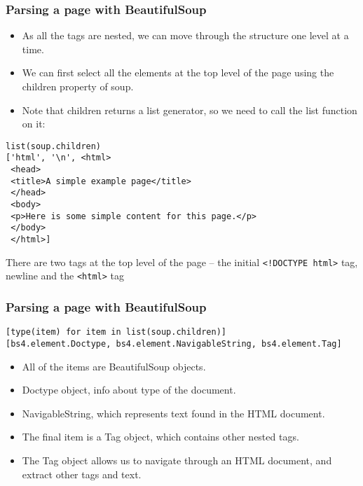 \begin{frame}[fragile]\frametitle{Parsing a page with BeautifulSoup}
    \begin{itemize}
    \item As all the tags are nested, we can move through the structure one level at a time. 
    \item We can first select all the elements at the top level of the page using the children property of soup. 
    \item Note that children returns a list generator, so we need to call the list function on it:
    \end{itemize}
        \begin{lstlisting}
list(soup.children)
['html', '\n', <html>
 <head>
 <title>A simple example page</title>
 </head>
 <body>
 <p>Here is some simple content for this page.</p>
 </body>
 </html>]
\end{lstlisting}
There are two tags at the top level of the page -- the initial \lstinline|<!DOCTYPE html>| tag, newline and the \lstinline|<html>| tag
\end{frame}

\begin{frame}[fragile]\frametitle{Parsing a page with BeautifulSoup}

        \begin{lstlisting}
[type(item) for item in list(soup.children)]
[bs4.element.Doctype, bs4.element.NavigableString, bs4.element.Tag]
\end{lstlisting}

    \begin{itemize}
    \item All of the items are BeautifulSoup objects. 
    \item Doctype object, info about type of the document.
    \item NavigableString, which represents text found in the HTML document. 
    \item The final item is a Tag object, which contains other nested tags.
    \item The Tag object allows us to navigate through an HTML document, and extract other tags and text. 
    \end{itemize}
\end{frame}

